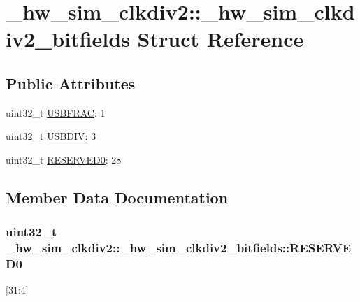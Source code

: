 \hypertarget{struct__hw__sim__clkdiv2_1_1__hw__sim__clkdiv2__bitfields}{}\section{\+\_\+hw\+\_\+sim\+\_\+clkdiv2\+:\+:\+\_\+hw\+\_\+sim\+\_\+clkdiv2\+\_\+bitfields Struct Reference}
\label{struct__hw__sim__clkdiv2_1_1__hw__sim__clkdiv2__bitfields}
\subsection*{Public Attributes}
\begin{DoxyCompactItemize}
\item 
uint32\+\_\+t \hyperlink{struct__hw__sim__clkdiv2_1_1__hw__sim__clkdiv2__bitfields_a82ac7c465612398276e2c4e918ab25b1}{U\+S\+B\+F\+R\+AC}\+: 1
\item 
uint32\+\_\+t \hyperlink{struct__hw__sim__clkdiv2_1_1__hw__sim__clkdiv2__bitfields_a43c73aeb258926bd19c95eb576be7e3c}{U\+S\+B\+D\+IV}\+: 3
\item 
uint32\+\_\+t \hyperlink{struct__hw__sim__clkdiv2_1_1__hw__sim__clkdiv2__bitfields_a8c9a9de79fd514740678a9e234448770}{R\+E\+S\+E\+R\+V\+E\+D0}\+: 28
\end{DoxyCompactItemize}


\subsection{Member Data Documentation}
\subsubsection[{\texorpdfstring{R\+E\+S\+E\+R\+V\+E\+D0}{RESERVED0}}]{\setlength{\rightskip}{0pt plus 5cm}uint32\+\_\+t \+\_\+hw\+\_\+sim\+\_\+clkdiv2\+::\+\_\+hw\+\_\+sim\+\_\+clkdiv2\+\_\+bitfields\+::\+R\+E\+S\+E\+R\+V\+E\+D0}\hypertarget{struct__hw__sim__clkdiv2_1_1__hw__sim__clkdiv2__bitfields_a8c9a9de79fd514740678a9e234448770}{}\label{struct__hw__sim__clkdiv2_1_1__hw__sim__clkdiv2__bitfields_a8c9a9de79fd514740678a9e234448770}
\mbox{[}31\+:4\mbox{]} 
